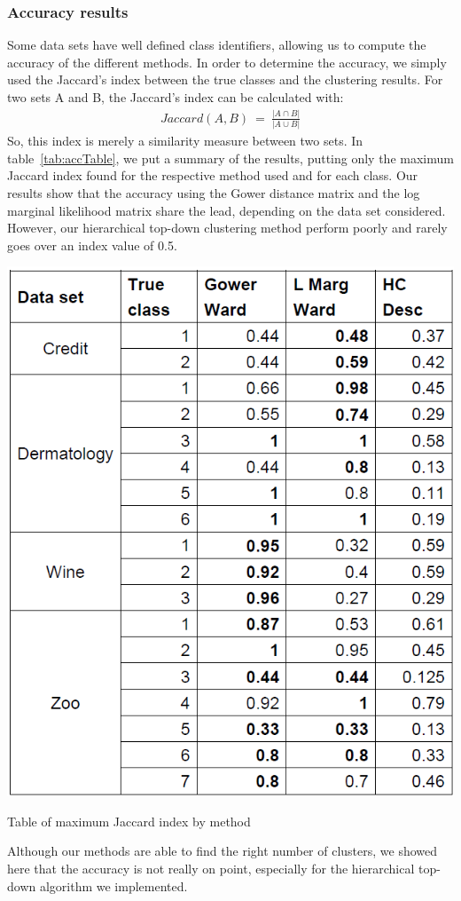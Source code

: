 \documentclass[twocolumn,12pt]{article}
\begin{document}
\subsubsection{Accuracy results}

Some data sets have well defined class identifiers, allowing us to compute the accuracy of the different methods.
In order to determine the accuracy, we simply used the Jaccard's index between the true classes and the clustering results. 
For two sets A and B, the Jaccard's index can be calculated with:
\begin{align}
    Jaccard(A,B)\ =\ \frac{|A\cap B|}{|A\cup B|}
\end{align}
So, this index is merely a similarity measure between two sets.
In table~\ref{tab:accTable}, we put a summary of the results, putting only the maximum Jaccard index found for the respective method used and for each class.
Our results show that the accuracy using the Gower distance matrix and the log marginal likelihood matrix share the lead, depending on the data set considered.
However, our hierarchical top-down clustering method perform poorly and rarely goes over an index value of 0.5.
\begin{table}[!]
    \centering
    \includegraphics[scale=0.4]{img/AccTable.png}
    \caption{Table of maximum Jaccard index by method}
    \label{tab:accTable}
\end{table}
Although our methods are able to find the right number of clusters, we showed here that the accuracy is not really on point, especially for the hierarchical top-down algorithm we implemented.
\end{document}
